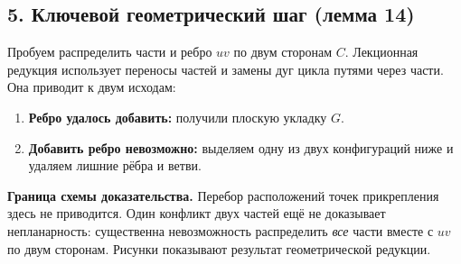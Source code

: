 \newpage
\subsection*{5. Ключевой геометрический шаг (лемма 14)}
\hypertarget{pk:step5}{}
Пробуем распределить части и ребро \(uv\) по двум сторонам \(C\).
Лекционная редукция использует переносы частей и замены дуг цикла
путями через части. Она приводит к двум исходам:
\begin{enumerate}[leftmargin=*,itemsep=3pt,topsep=3pt]
\item \textbf{Ребро удалось добавить:} получили плоскую укладку \(G\).
\item \textbf{Добавить ребро невозможно:} выделяем одну из двух
конфигураций ниже и удаляем лишние рёбра и ветви.
\end{enumerate}
\begin{tcolorbox}[colback=cbOrangeBack,colframe=cbOrange]
\textbf{Граница схемы доказательства.}
Перебор расположений точек прикрепления здесь не приводится.
Один конфликт двух частей ещё не доказывает непланарность:
существенна невозможность распределить \emph{все} части вместе с \(uv\)
по двум сторонам. Рисунки показывают результат геометрической редукции.
\end{tcolorbox}

